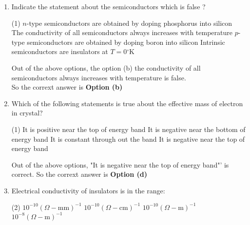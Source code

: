 \begin{enumerate}
\begin{tasks}
		\task[\textbf{d.}]  The addition of an impurity in the silicon always decreases its conductivity
	\end{tasks}
\begin{answer}
		Out of above options, the option (d) "The addition of an impurity in the silicon always decreases its conductivity" is not type.\\
	So the corrext answer is \textbf{Option (d)}
\end{answer}
\item Indicate the statement about the semiconductors which is false ?
 \begin{tasks}(1)
	\task[\textbf{a.}] $n$-type semiconductors are obtained by doping phosphorus into silicon
	\task[\textbf{b.}]The conductivity of all semiconductors always increases with temperature
	\task[\textbf{c.}]$p$-type semiconductors are obtained by doping boron into silicon
	\task[\textbf{d.}] Intrinsic semiconductors are insulators at $T=0{ }^{\circ} \mathrm{K}$
\end{tasks}
\begin{answer}
Out of the above options, the option (b) the conductivity of all semiconductors always increases with temperature is false.\\
	So the corrext answer is \textbf{Option (b)}
\end{answer}
	\item Which of the following statements is true about the effective mass of electron in crystal?
	 \begin{tasks}(1)
		\task[\textbf{a.}]It is positive near the top of energy band 
		\task[\textbf{b.}]It is negative near the bottom of energy band
		\task[\textbf{c.}]It is constant through out the band
		\task[\textbf{d.}] It is negative near the top of energy band
	\end{tasks}
	\begin{answer}
	Out of the above options, "It is negative near the top of energy band"' is correct.
	So the corrext answer is \textbf{Option (d)}
	\end{answer}
\item Electrical conductivity of insulators is in the range:
	 \begin{tasks}(2)
		\task[\textbf{a.}]$10^{-10}(\Omega-\mathrm{mm})^{-1}$
		\task[\textbf{b.}]$10^{-10}(\Omega-\mathrm{cm})^{-1}$
		\task[\textbf{c.}] $10^{-10}(\Omega-\mathrm{m})^{-1}$
		\task[\textbf{d.}] $10^{-8}(\Omega-\mathrm{m})^{-1}$
	\end{tasks}
	\begin{answer}

\end{answer}
\end{enumerate}
